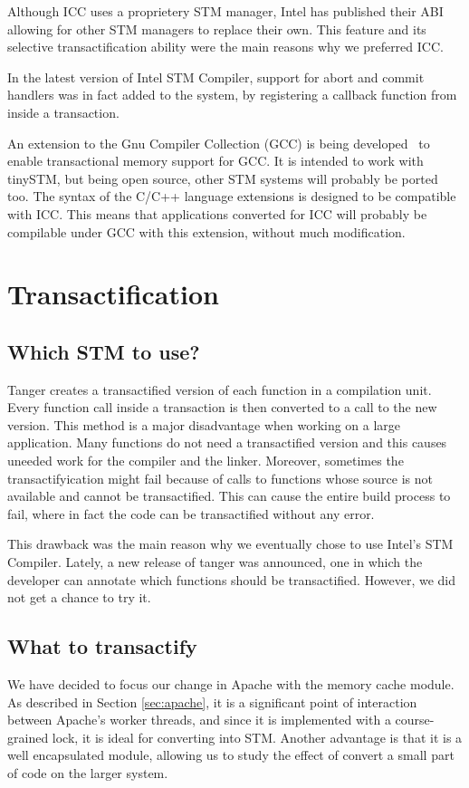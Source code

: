 \documentclass[preprint,11pt]{sigplanconf}
\let \cite = \citep
\begin{document}
Although ICC uses a proprietery STM manager, Intel has published their
ABI~\cite{icc:abi} allowing for other STM managers to replace their own. This feature
and its selective transactification ability were the main reasons why we
preferred ICC.

In the latest version of Intel STM Compiler, support for abort and commit
handlers was in fact added to the system, by registering a callback function
from inside a transaction.

An extension to the Gnu Compiler Collection (GCC) is being developed~\cite{gcctm} to
enable transactional memory support for GCC. It is intended to work with
tinySTM, but being open source, other STM systems will probably be ported too.
The syntax of the C/C++ language extensions is designed to be compatible with
ICC. This means that applications converted for ICC will probably be compilable
under GCC with this extension, without much modification.

\section{Transactification}\label{sec:transactification}
\subsection{Which STM to use?}
{\sc Tanger} creates a transactified version of each function in a compilation
unit.  Every function call inside a transaction is then converted to a call to
the new version. This method is a major disadvantage when working on a large
application. Many functions do not need a transactified version and this causes
uneeded work for the compiler and the linker. Moreover, sometimes the
transactifyication might fail because of calls to functions whose source is not
available and cannot be transactified. This can cause the entire build process
to fail, where in fact the code can be transactified without any error.

This drawback was the main reason why we eventually chose to use Intel's STM 
Compiler. Lately, a new release of tanger was announced, one in which the developer 
can annotate which functions should be transactified. However, we did not get a
chance to try it.

\subsection{What to transactify}
We have decided to focus our change in Apache with the memory cache module. As
described in Section \ref{sec:apache}, it is a significant point of interaction
between Apache's worker threads, and since it is implemented with a course-grained
lock, it is ideal for converting into STM. Another advantage is that it is a
well encapsulated module, allowing us to study the effect of convert a small 
part of code on the larger system.
\end{document}
